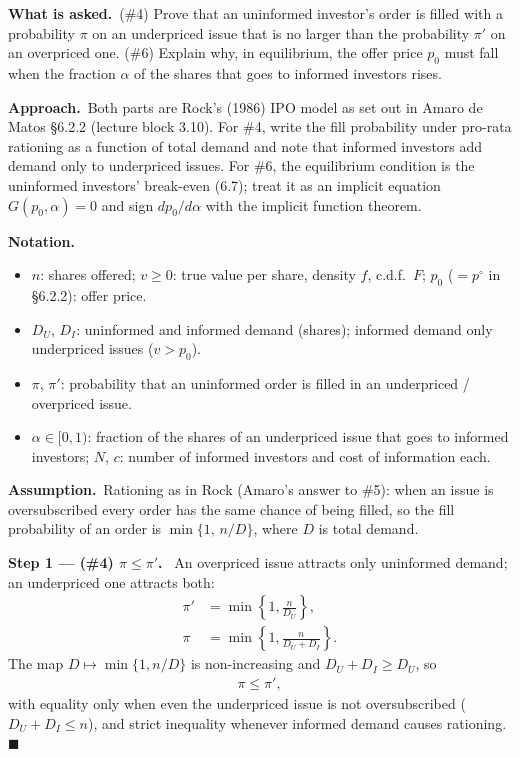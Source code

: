 \documentclass[11pt,a4paper]{article}
\newcommand{\notation}{\par\noindent\textbf{Notation.}}
\newcommand{\step}[2]{\par\medskip\noindent\textbf{Step #1 --- #2.}~}
\newcommand{\assume}{\par\smallskip\noindent\textbf{Assumption.}~}
\newcommand{\asked}{\par\medskip\noindent\textbf{What is asked.}~}
\newcommand{\approach}{\par\smallskip\noindent\textbf{Approach.}~}
\begin{document}
\asked (\#4) Prove that an uninformed investor's order is filled with a probability $\pi$ on an underpriced issue that is no larger than the probability $\pi'$ on an overpriced one. (\#6) Explain why, in equilibrium, the offer price $p_0$ must fall when the fraction $\alpha$ of the shares that goes to informed investors rises.

\approach Both parts are Rock's (1986) IPO model as set out in Amaro de Matos \S6.2.2 (lecture block 3.10). For \#4, write the fill probability under pro-rata rationing as a function of total demand and note that informed investors add demand only to underpriced issues. For \#6, the equilibrium condition is the uninformed investors' break-even (6.7); treat it as an implicit equation $G(p_0,\alpha)=0$ and sign $dp_0/d\alpha$ with the implicit function theorem.

\notation
\begin{itemize}
  \item $n$: shares offered; $v\ge0$: true value per share, density $f$, c.d.f.\ $F$; $p_0$ ($=p^\circ$ in \S6.2.2): offer price.
  \item $D_U$, $D_I$: uninformed and informed demand (shares); informed demand only underpriced issues ($v>p_0$).
  \item $\pi$, $\pi'$: probability that an uninformed order is filled in an underpriced / overpriced issue.
  \item $\alpha\in[0,1)$: fraction of the shares of an underpriced issue that goes to informed investors; $N$, $c$: number of informed investors and cost of information each.
\end{itemize}

\assume Rationing as in Rock (Amaro's answer to \#5): when an issue is oversubscribed every order has the same chance of being filled, so the fill probability of an order is $\min\{1,\,n/D\}$, where $D$ is total demand.

\step{1}{(\#4) $\pi\le\pi'$} An overpriced issue attracts only uninformed demand; an underpriced one attracts both:
\begin{align}
  \pi' &= \min\left\{1,\frac{n}{D_U}\right\}, \label{t3e7-pip}\\
  \pi  &= \min\left\{1,\frac{n}{D_U+D_I}\right\}. \label{t3e7-pi}
\end{align}
The map $D\mapsto\min\{1,n/D\}$ is non-increasing and $D_U+D_I\ge D_U$, so
\begin{align}
  \pi \le \pi', \label{t3e7-ineq}
\end{align}
with equality only when even the underpriced issue is not oversubscribed ($D_U+D_I\le n$), and strict inequality whenever informed demand causes rationing. $\blacksquare$
\end{document}
